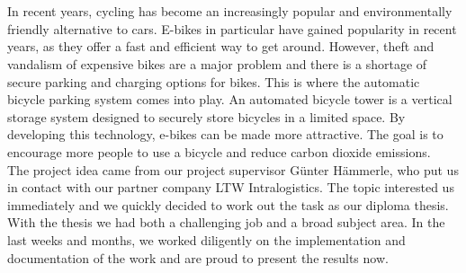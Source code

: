 \section*{}
In recent years, cycling has become an increasingly popular and environmentally friendly alternative to cars. E-bikes in particular have gained popularity in recent years, as they offer a fast and efficient way to get around. However, theft and vandalism of expensive bikes are a major problem and there is a shortage of secure parking and charging options for bikes. This is where the automatic bicycle parking system comes into play. An automated bicycle tower is a vertical storage system designed to securely store bicycles in a limited space. By developing this technology, e-bikes can be made more attractive. The goal is to encourage more people to use a bicycle and reduce carbon dioxide emissions.\\
The project idea came from our project supervisor Günter Hämmerle, who put us in contact with our partner company LTW Intralogistics. The topic interested us immediately and we quickly decided to work out the task as our diploma thesis.\\
With the thesis we had both a challenging job and a broad subject area. In the last weeks and months, we worked diligently on the implementation and documentation of the work and are proud to present the results now.

